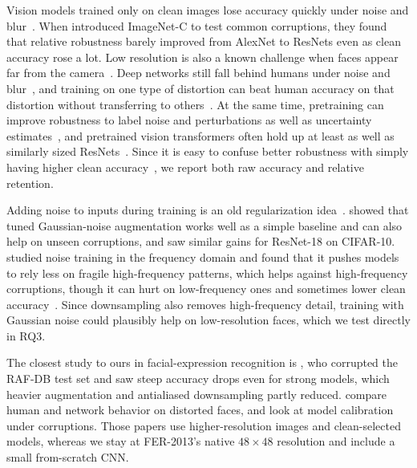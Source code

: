 \documentclass{article}
\begin{document}
Vision models trained only on clean images lose accuracy quickly under noise and
blur~\cite{dodge2016quality,vasiljevic2016blur}. When \citet{hendrycks2019benchmarking} introduced ImageNet-C to test
common corruptions, they found that relative robustness barely improved from AlexNet to ResNets even as clean accuracy
rose a lot. Low resolution is also a known challenge when faces appear far from the
camera~\cite{tian2004resolution,wang2016vlr}. Deep networks still fall behind humans under noise and
blur~\cite{dodge2017human}, and training on one type of distortion can beat human accuracy on that distortion without
transferring to others~\cite{geirhos2018generalisation}. At the same time, pretraining can improve robustness to label
noise and perturbations as well as uncertainty estimates~\cite{hendrycks2019pretraining}, and pretrained vision
transformers often hold up at least as well as similarly sized
ResNets~\cite{bhojanapalli2021robustness,paul2022robust,naseer2021intriguing}. Since it is easy to confuse better
robustness with simply having higher clean accuracy~\cite{taori2020measuring}, we report both raw accuracy and relative
retention.

Adding noise to inputs during training is an old regularization idea~\cite{bishop1995noise}. \citet{rusak2020simple}
showed that tuned Gaussian-noise augmentation works well as a simple baseline and can also help on unseen corruptions,
and \citet{ramirez2025noisy} saw similar gains for ResNet-18 on CIFAR-10. \citet{yin2019fourier} studied noise
training in the frequency domain and found that it pushes models to rely less on fragile high-frequency patterns, which
helps against high-frequency corruptions, though it can hurt on low-frequency ones and sometimes lower clean
accuracy~\cite{lopes2019patchgaussian,ford2019adversarial}. Since downsampling also removes high-frequency detail,
training with Gaussian noise could plausibly help on low-resolution faces, which we test directly in RQ3.

The closest study to ours in facial-expression recognition is \citet{greco2022benchmarking}, who corrupted the RAF-DB
test set and saw steep accuracy drops even for strong models, which heavier augmentation and antialiased downsampling
partly reduced. \citet{leveque2022comparing} compare human and network behavior on distorted faces, and
\citet{neo2023ferc} look at model calibration under corruptions. Those papers use higher-resolution images and
clean-selected models, whereas we stay at FER-2013's native $48{\times}48$ resolution and include a small from-scratch
CNN.
\end{document}
